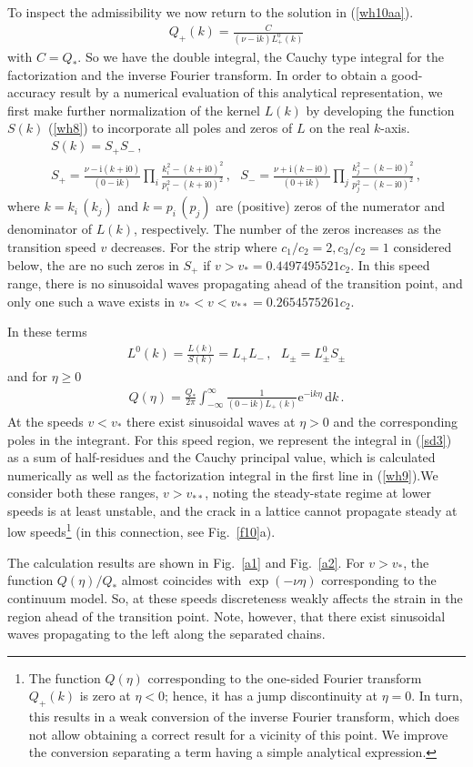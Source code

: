 \documentclass[12pt]{article}
\newcommand{\f}{\frac}
\newcommand{\n}{\nonumber \\}
\newcommand{\inti}{\int_{-\infty}^\infty}
\newcommand{\beq}{\begin{eqnarray}}
\newcommand{\eeq}[1]{\label{#1}\end{eqnarray}}
\newcommand\eq[1]{(\ref{#1})}
\newcommand\fig[1]{Fig.~\ref{#1}}
\newcommand{\res}{respectively}
\newcommand{\Gn}{\eta}
\newcommand\D{\,\mathrm{d}}
\newcommand\I{\mathrm{i}}
\newcommand\E{\mathrm{e}}
\begin{document}
To inspect the admissibility we now return to the solution in \eq{wh10aa}.
\beq Q_+(k) =\f{C}{(\nu-\I k)L^0_+(k)}\eeq{wh10aaa}
with $C=Q_*$. So we have the double integral, the Cauchy type integral for the factorization and the inverse Fourier transform.
In order to obtain a good-accuracy result by a numerical evaluation of this analytical representation, we first make further normalization of the kernel $L(k)$ by developing the function $S(k)$ \eq{wh8} to incorporate all poles and zeros of $L$ on the real $k$-axis.
\beq S(k) = S_+S_-\,,\n S_+= \f{\nu-\I (k+\I 0)}{(0-\I k)}\prod_{i}\f{k_i^2 -(k+\I 0)^2}{p_i^2 -(k+\I 0)^2}\,,~~~S_-= \f{\nu+\I (k-\I 0)}{(0+\I k)}\prod_{j}\f{k_j^2 -(k-\I 0)^2}{p_j^2 -(k-\I 0)^2}\,,\eeq{sd1}
where $k=k_i \, (k_j)$ and $k=p_i \, (p_j)$ are (positive) zeros of the numerator and denominator of $L(k)$, \res. The number of the zeros increases as the transition speed $v$ decreases. For the strip where $c_1/c_2=2, c_3/c_2=1$ considered below, the are no such zeros in $S_+$ if $v> v_*=0.4497495521 c_2$. In this speed range, there is no sinusoidal waves propagating ahead of the transition point, and only one such a wave exists in $v_*< v < v_{**}=0.2654575261 c_2$.

In these terms
\beq L^0(k) = \f{L(k)}{S(k)} = L_+L_-\,,~~~L_\pm = L_\pm^0 S_\pm\eeq{sd2}
and for $\Gn\ge 0$
\beq Q(\Gn) = \f{Q_*}{2\pi}\inti \f{1}{(0-\I k)L_+(k)}\E^{-\I k \Gn}\D k\,.\eeq{sd3}
At the speeds $v<v_{*}$ there exist sinusoidal waves at $\Gn>0$ and the corresponding poles in the integrant. For this speed region, we represent the integral in \eq{sd3} as a sum of half-residues and the Cauchy principal value, which is calculated numerically as well as the factorization integral in the first line in \eq{wh9}.We consider both these ranges, $v>v_{**}$, noting the steady-state regime at lower speeds is at least unstable, and the crack in a lattice cannot propagate steady at low speeds\footnote{The function $Q(\Gn)$ corresponding to the one-sided Fourier transform $Q_+(k)$ is zero at $\Gn<0$; hence, it has a jump discontinuity at $\Gn =0$. In turn, this results in a weak conversion of the inverse Fourier transform, which does not allow obtaining a correct result for a vicinity of this point. We improve the conversion separating a term having a simple analytical expression.} (in this connection, see \fig{f10}a).

The calculation results are shown in \fig{a1} and  \fig{a2}. For $v>v_*$, the function $Q(\Gn)/Q_*$  almost coincides with $\exp(-\nu\Gn)$ corresponding to the continuum model. So, at these speeds discreteness weakly affects the strain in the region ahead of the transition point. Note, however, that there exist sinusoidal waves propagating to the left along the separated chains.
\end{document}
